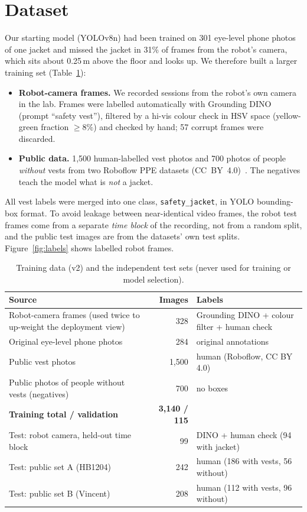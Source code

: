\documentclass[10pt]{article}
\begin{document}
\section{Dataset}
Our starting model (YOLOv8n) had been trained on 301 eye-level phone photos of one jacket and missed the jacket in 31\% of frames from the robot's camera, which sits about 0.25\,m above the floor and looks up. We therefore built a larger training set (Table~\ref{tab:data}):
\begin{itemize}
  \item \textbf{Robot-camera frames.} We recorded sessions from the robot's own camera in the lab. Frames were labelled automatically with Grounding DINO~\cite{gdino} (prompt ``safety vest''), filtered by a hi-vis colour check in HSV space (yellow-green fraction $\geq 8\%$) and checked by hand; 57 corrupt frames were discarded.
  \item \textbf{Public data.} 1,500 human-labelled vest photos and 700 photos of people \emph{without} vests from two Roboflow PPE datasets (CC~BY~4.0)~\cite{hb1204,vincent}. The negatives teach the model what is \emph{not} a jacket.
\end{itemize}
All vest labels were merged into one class, \texttt{safety\_jacket}, in YOLO bounding-box format. To avoid leakage between near-identical video frames, the robot test frames come from a separate \emph{time block} of the recording, not from a random split, and the public test images are from the datasets' own test splits. Figure~\ref{fig:labels} shows labelled robot frames.

\begin{table}[htbp]
\centering\small
\caption{Training data (v2) and the independent test sets (never used for training or model selection).}
\label{tab:data}
\begin{tabularx}{\linewidth}{>{\raggedright\arraybackslash}X r >{\raggedright\arraybackslash}p{5.6cm}}
\toprule
\textbf{Source} & \textbf{Images} & \textbf{Labels} \\
\midrule
Robot-camera frames (used twice to up-weight the deployment view) & 328 & Grounding DINO + colour filter + human check \\
Original eye-level phone photos & 284 & original annotations \\
Public vest photos & 1,500 & human (Roboflow, CC BY 4.0) \\
Public photos of people without vests (negatives) & 700 & no boxes \\
\textbf{Training total / validation} & \textbf{3,140 / 115} & \\
\midrule
Test: robot camera, held-out time block & 99 & DINO + human check (94 with jacket) \\
Test: public set A (HB1204) & 242 & human (186 with vests, 56 without) \\
Test: public set B (Vincent) & 208 & human (112 with vests, 96 without) \\
\bottomrule
\end{tabularx}
\end{table}
\end{document}
